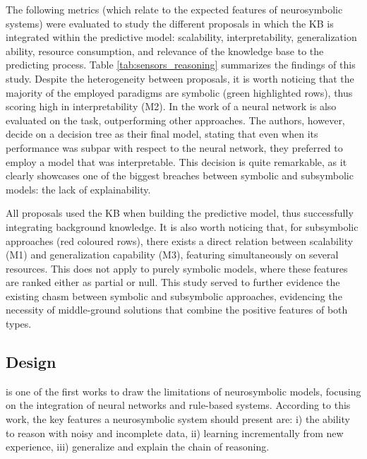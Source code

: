 The following metrics (which relate to the expected features of neurosymbolic systems) were evaluated to study the different proposals in which the KB is integrated within the predictive model: scalability, interpretability, generalization ability, resource consumption, and relevance of the knowledge base to the predicting process. Table \ref{tab:sensors_reasoning} summarizes the findings of this study. Despite the heterogeneity between proposals, it is worth noticing that the majority of the employed paradigms are symbolic (green highlighted rows), thus scoring high in interpretability (M2). In the work of \cite{olszewskiturek} a neural network is also evaluated on the task, outperforming other approaches. The authors, however, decide on a decision tree as their final model, stating that even when its performance was subpar with respect to the neural network, they preferred to employ a model that was interpretable. This decision is quite remarkable, as it clearly showcases one of the biggest breaches between symbolic and subsymbolic models: the lack of explainability. 

All proposals used the KB when building the predictive model, thus successfully integrating background knowledge. It is also worth noticing that, for subsymbolic approaches (red coloured rows), there exists a direct relation between scalability (M1) and generalization capability (M3), featuring simultaneously on several resources. This does not apply to purely symbolic models, where these features are ranked either as partial or null. This study served to further evidence the existing chasm between symbolic and subsymbolic approaches, evidencing the necessity of middle-ground solutions that combine the positive features of both types.


\subsection{Design}
\cite{mcgarry_hybrid_1999} is one of the first works to draw the limitations of neurosymbolic models, focusing on the integration of neural networks and rule-based systems. According to this work, the key features a neurosymbolic system should present are: i) the ability to reason with noisy and incomplete data, ii) learning incrementally from new experience, iii) generalize and explain the chain of reasoning. %

